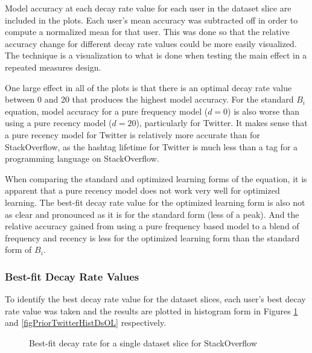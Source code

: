 \documentclass[man,floatsintext,donotrepeattitle]{apa6}
\begin{document}
Model accuracy at each decay rate value for each user in the dataset slice are included in the plots.
Each user's mean accuracy was subtracted off in order to compute a normalized mean for that user.
This was done so that the relative accuracy change for different decay rate values could be more easily visualized.
The technique is a visualization to what is done when testing the main effect in a repeated measures design.

One large effect in all of the plots is that there is an optimal decay rate value between 0 and 20 that produces the highest model accuracy.
For the standard $B_{i}$ equation, model accuracy for a pure frequency model ($d=0$) is also worse than using a pure recency model ($d=20$), particularly for Twitter.
It makes sense that a pure recency model for Twitter is relatively more accurate than for StackOverflow, as the hashtag lifetime for Twitter is much less than a tag for a programming language on StackOverflow.

When comparing the standard and optimized learning forms of the equation, it is apparent that a pure recency model does not work very well for optimized learning.
The best-fit decay rate value for the optimized learning form is also not as clear and pronounced as it is for the standard form (less of a peak).
And the relative accuracy gained from using a pure frequency based model to a blend of frequency and recency is less for the optimized learning form than the standard form of $B_{i}$.

\subsubsection{Best-fit Decay Rate Values}

To identify the best decay rate value for the dataset slices,
each user's best decay rate value was taken and the results are plotted in histogram form in Figures \ref{figPriorSOQHistDsOL} and \ref{figPriorTwitterHistDsOL} respectively.

\begin{figure}[!htbp]
  {%
    \setlength{\fboxsep}{0pt}%
    \setlength{\fboxrule}{1pt}%
    \hfill
    \hfill
    \caption{Best-fit decay rate for a single dataset slice for StackOverflow}
    \label{figPriorSOQHistDsOL}
  }%
\end{figure}
\end{document}
